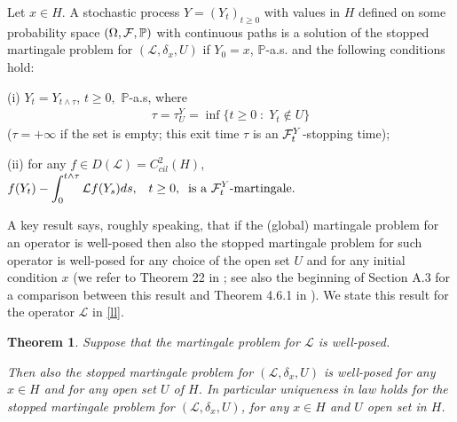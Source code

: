 \documentclass[preprint]{imsart}
\newtheorem{theorem}{Theorem}
\def\P{\mathbb P}
\def\ds{\displaystyle}
\def\L{\mathcal L}
\begin{document}
  
 Let $x \in H$.  A  stochastic process $Y = (Y_t)_{t \ge 0}$ with values in $H$
defined on some probability space  $ (\Omega, {\cal F}, \P)$
with continuous paths 
is a  solution of the stopped martingale problem for $(\L, \delta_x, U)$ if  $Y_0 =x$, $\P$-a.s.  and the
 following conditions hold:

 (i) $Y_t = Y_{t \wedge \tau}$, $t \ge 0,$  $\P$-a.s, where
\begin{equation} \label{ta1}
 \begin{array}{l}
\tau = \tau^Y_U= \inf \{ t \ge 0 \; : \; Y_t \not \in U  \}
 \end{array}
 \end{equation}   
($\tau = + \infty$ if the set is empty;  this exit time $\tau$ is an
${\cal F}_t^Y$-stopping time);


 (ii) for any $f \in D(\L) =  C^2_{cil}(H)$, 
  $  \ds  f(Y_t) - \int_0^{t \wedge \tau}
    \L f(Y_s) ds, \;\;\; t \ge 0, \;\; \text{is a ${\cal F}_t^Y$-martingale.}$
 
 A key result
 says, roughly speaking,  
 that if the (global) martingale problem for an operator  is well-posed then also the
 stopped martingale problem for such operator is well-posed for any choice
  of the open set $U$ and for any initial condition $x$ (we refer to  Theorem 22 in \cite{PrPot}; see   also the beginning of Section A.3 for a comparison  between this result and  Theorem 4.6.1 in \cite{EK}).   
   We state this  result for the operator $\L$ in \eqref{ll}.
   \begin{theorem} \label{key} Suppose  that
 the  martingale problem for $\L$ is well-posed.

  Then also the
 stopped martingale problem for $(\L, \delta_x, U)$ is well-posed for any  $x \in H$ and for any open set $U$ of $H$. In particular uniqueness in law holds for the
 stopped martingale problem  for $(\L, \delta_x, U)$, for any $x \in H$ and   $U$ open set in $H$.  
 \end{theorem}

 
     
 
\end{document}
